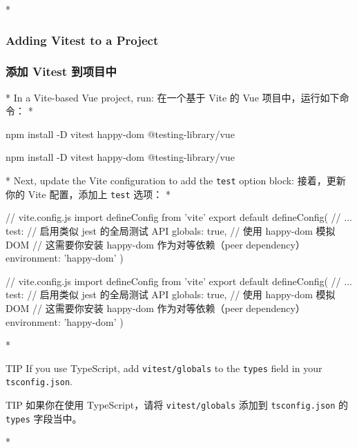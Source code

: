 \begin{paracol}{2}
 
\switchcolumn[0]*%
\subsubsection{Adding Vitest to a Project}
\switchcolumn
\subsubsection{添加 Vitest 到项目中}
\switchcolumn[0]*%
In a Vite-based Vue project, run:
\switchcolumn
在一个基于 Vite 的 Vue 项目中，运行如下命令：
\switchcolumn[0]*%
\begin{codeShell}
npm install -D vitest happy-dom @testing-library/vue
\end{codeShell}  
\switchcolumn
\begin{codeShell}
npm install -D vitest happy-dom @testing-library/vue
\end{codeShell}  
\switchcolumn[0]*%
Next, update the Vite configuration to add the \texttt{test} option
block:
\switchcolumn
接着，更新你的 Vite 配置，添加上 \texttt{test} 选项：
\switchcolumn[0]*%
\begin{codeJs}
// vite.config.js
import { defineConfig } from 'vite'
export default defineConfig({
  // ...
  test: {
    // 启用类似 jest 的全局测试 API
    globals: true,
    // 使用 happy-dom 模拟 DOM
    // 这需要你安装 happy-dom 作为对等依赖（peer dependency）
    environment: 'happy-dom'
  }
})
\end{codeJs}
\switchcolumn
\begin{codeJs}
// vite.config.js
import { defineConfig } from 'vite'
export default defineConfig({
  // ...
  test: {
    // 启用类似 jest 的全局测试 API
    globals: true,
    // 使用 happy-dom 模拟 DOM
    // 这需要你安装 happy-dom 作为对等依赖（peer dependency）
    environment: 'happy-dom'
  }
})
\end{codeJs}
\switchcolumn[0]*%
\begin{vueQuote}{TIP}
If you use TypeScript, add \texttt{vitest/globals} to the \texttt{types}
field in your \texttt{tsconfig.json}.
\end{vueQuote} 
\switchcolumn
\begin{vueQuote}{TIP}
如果你在使用 TypeScript，请将 \texttt{vitest/globals} 添加到
\texttt{tsconfig.json} 的 \texttt{types} 字段当中。
\end{vueQuote} 
\switchcolumn[0]*%
\begin{codeJson}

\end{codeJson}
\end{paracol}
